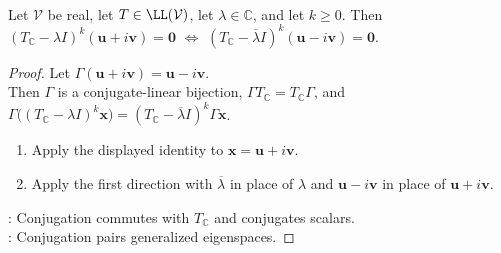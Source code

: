 \begin{lemma} \label{lem:complexification-conjugate-generalized-eigenspaces} \\
Let $\mathcal{V}$ be real, let $T\in\LL(\mathcal{V})$, let $\lambda\in\mathbb{C}$, and let $k\geq0$. Then $(T_{\mathbb{C}}-\lambda I)^k(\mathbf{u}+i\mathbf{v})=\mathbf{0}$ $\Longleftrightarrow$ $(T_{\mathbb{C}}-\overline{\lambda} I)^k(\mathbf{u}-i\mathbf{v})=\mathbf{0}$.
\begin{proof}
Let $\Gamma(\mathbf{u}+i\mathbf{v})=\mathbf{u}-i\mathbf{v}$.\\
Then $\Gamma$ is a conjugate-linear bijection, $\Gamma T_{\mathbb{C}}=T_{\mathbb{C}}\Gamma$, and $\Gamma\bigl((T_{\mathbb{C}}-\lambda I)^k\mathbf{x}\bigr) =(T_{\mathbb{C}}-\overline{\lambda} I)^k\Gamma\mathbf{x}$.
\begin{enumerate}[label=\roman*.]
\setlength{\itemsep}{0pt}
\item[$(\Rightarrow)$] Apply the displayed identity to $\mathbf{x}=\mathbf{u}+i\mathbf{v}$.
\item[$(\Leftarrow)$] Apply the first direction with $\overline{\lambda}$ in place of $\lambda$ and $\mathbf{u}-i\mathbf{v}$ in place of $\mathbf{u}+i\mathbf{v}$.
\end{enumerate}
: Conjugation commutes with $T_{\mathbb{C}}$ and conjugates scalars.\\
: Conjugation pairs generalized eigenspaces.
\end{proof}
\end{lemma}

